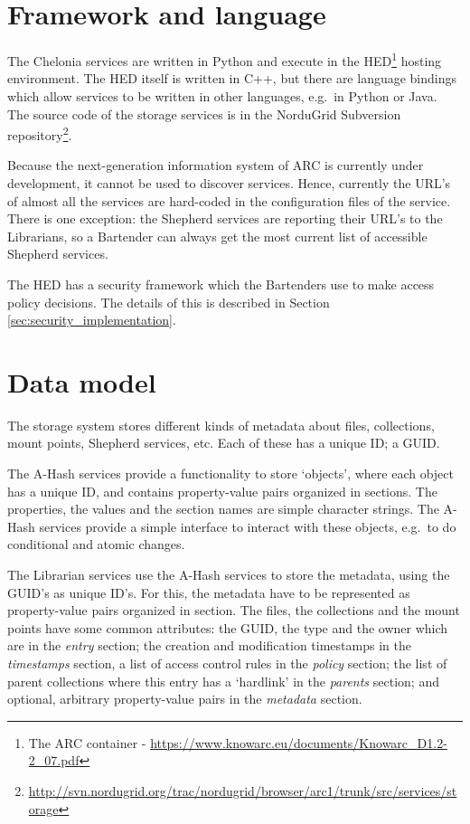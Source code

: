\documentclass{book}
\begin{document}
\section{Framework and language} %
\label{sec:framework_and_language}

The Chelonia services are written in Python and execute in the HED\footnote{The ARC container - \url{https://www.knowarc.eu/documents/Knowarc\_D1.2-2\_07.pdf}} hosting environment. The HED itself is written in C++, but there are language bindings which allow services to be written in other languages, e.g.~in Python or Java. The source code of the storage services is in the NorduGrid Subversion repository\footnote{\url{http://svn.nordugrid.org/trac/nordugrid/browser/arc1/trunk/src/services/storage}}.

Because the next-generation information system of ARC is currently under development, it cannot be used to discover services. Hence, currently the URL's of almost all the services are hard-coded in the configuration files of the service. There is one exception: the Shepherd services are reporting their URL's to the Librarians, so a Bartender can always get the most current list of accessible Shepherd services.

The HED has a security framework which the Bartenders use to make access policy decisions. The details of this is described in Section \ref{sec:security_implementation}.


\section{Data model} %
\label{sec:data_model}

The storage system stores different kinds of metadata about files, collections, mount points, Shepherd services, etc. Each of these has a unique ID; a GUID.

The A-Hash services provide a functionality to store `objects', where each object has a unique ID, and contains property-value pairs organized in sections. The properties, the values and the section names are simple character strings. The A-Hash services provide a simple interface to interact with these objects, e.g.~to do conditional and atomic changes.

The Librarian services use the A-Hash services to store the metadata, using the GUID's as unique ID's. For this, the metadata have to be represented as property-value pairs organized in section. The files, the collections and the mount points have some common attributes: the GUID, the type and the owner which are in the \emph{entry} section; the creation and modification timestamps in the \emph{timestamps} section, a list of access control rules in the \emph{policy} section; the list of parent collections where this entry has a `hardlink' in the \emph{parents} section; and optional, arbitrary property-value pairs in the \emph{metadata} section.
\end{document}
